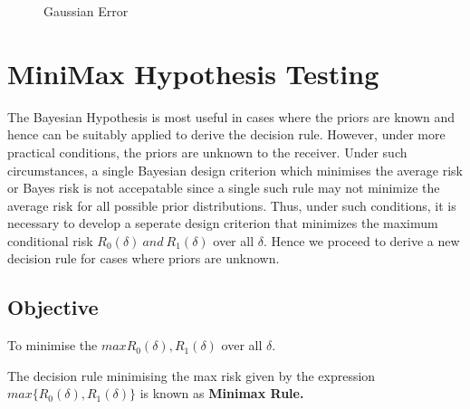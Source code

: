 \documentclass[a4paper,english,12pt]{article}
\begin{document}
\begin{exmp}
\begin{figure}[h]
\caption[gaussian error]{Gaussian Error}
\label{fig:gaussianerror}
\end{figure}

\end{exmp}

\section{MiniMax Hypothesis Testing}
The Bayesian Hypothesis is most useful in cases where the priors are known and hence can be suitably applied to derive the decision rule. However, under more practical conditions, the priors are unknown to the receiver. Under such circumstances, a single Bayesian design criterion which minimises the average risk or Bayes risk is not accepatable since a single such rule may not minimize the average risk for all possible prior distributions. Thus, under such conditions, it is necessary to develop a seperate design criterion that minimizes the maximum conditional risk $R_0(\delta)~and~R_1(\delta)$ over all $\delta$. Hence we proceed to derive a new decision rule for cases where priors are unknown.
\subsection{Objective}
To minimise the $max{R_0(\delta),R_1(\delta)}$ over all $\delta$.\\
\begin{defn}
The decision rule minimising the max risk given by the expression $max\{R_0(\delta),R_1(\delta)\}$ is known as \textbf{Minimax Rule.}
\end{defn}
\end{document}
